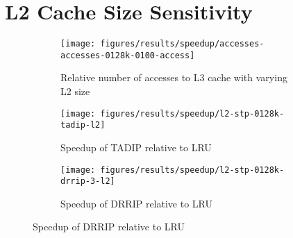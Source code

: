 
\section{L2 Cache Size Sensitivity}
\label{sec:results:l2size_sensitivity}


\begin{figure}[H]
    \centering
    \begin{subfigure}[b]{0.5\textwidth}
	    \texttt{[image: figures/results/speedup/accesses-accesses-0128k-0100-access]}
	    \caption{Relative number of accesses to L3 cache with varying L2 size}
	    \label{fig:results:l2:access}
    \end{subfigure}
    \begin{subfigure}[b]{0.5\textwidth}
        \texttt{[image: figures/results/speedup/l2-stp-0128k-tadip-l2]}
        \caption{Speedup of TADIP relative to LRU}
        \label{fig:results:l2:tadip}
    \end{subfigure}%
    \begin{subfigure}[b]{0.5\textwidth}
        \texttt{[image: figures/results/speedup/l2-stp-0128k-drrip-3-l2]}
        \caption{Speedup of DRRIP relative to LRU}
        \label{fig:results:l2:drrip}
    \end{subfigure}
\end{figure}
\clearpage
